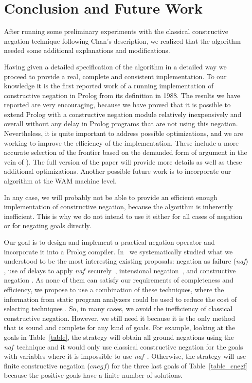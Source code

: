\documentclass{llncs}
\newcommand{\naf}{{\em naf}}\newcommand{\viejo}[1]{}
\begin{document}
\section{Conclusion and Future Work}
\label{conclusion}
After running some preliminary experiments with the classical constructive 
negation technique  following Chan's description, we realized that the
algorithm needed some additional explanations and modifications.

Having given a detailed specification of the algorithm in a detailed way
we proceed to provide a real, complete and consistent
implementation. To our knowledge it is the first reported work of a running
implementation
of constructive negation in Prolog from its definition in 1988. 
The results we have reported are very encouraging,
because we have proved that it is possible to extend Prolog with a
constructive negation module relatively inexpensively and overall
without any delay in Prolog programs that are not using this
negation. Nevertheless, it is quite important to address possible
optimizations, and we are working to improve the efficiency of the
implementation. These include a more accurate selection of the
frontier based on the demanded form of argument in the vein of
\cite{Moreno2}). The full version of the paper will provide more details
as well as these additional optimizations.
Another possible future work is to incorporate our algorithm
at the WAM machine level.

In any case, we will probably not be able to provide an efficient enough
implementation of constructive negation, because the algorithm is
inherently inefficient.  This is why we do not intend to
use it either for all cases of negation or for negating goals
directly.

Our goal is to design and implement a practical negation operator and
incorporate it into a Prolog compiler.
In~\cite{SusanaPADL2000,SusanaLPAR01} we systematically studied what
we understood to be the most interesting existing proposals: negation
as failure (\naf) \cite{Clark}, use of delays to apply \naf\
securely~\cite{naish:lncs}, intensional
negation~\cite{Barbuti1,Barbuti2}, and constructive negation
\cite{Chan1,Chan2,Drabent,Stuckey,Stuckey95}. As none of them can
satisfy our requirements of completeness and efficiency, we propose to
use a combination of these techniques, where the information from
static program analyzers could be used to reduce the cost of selecting
techniques \cite{SusanaLPAR01}. So, in many cases, we avoid the
inefficiency of classical constructive negation. However, we still
need it because it is the only method that is sound and complete for
any kind of goals. For example, looking at the goals in
Table~\ref{table}, the strategy will obtain all ground negations using
the \naf\ technique and it would only use classical constructive
negation for the goals with variables where it is impossible to use
\naf\ . Otherwise, the strategy will use finite constructive negation
($cnegf$) for the three last goals of Table~\ref{table_cnegf} because
the positive goals have a finite number of solutions.
\end{document}

